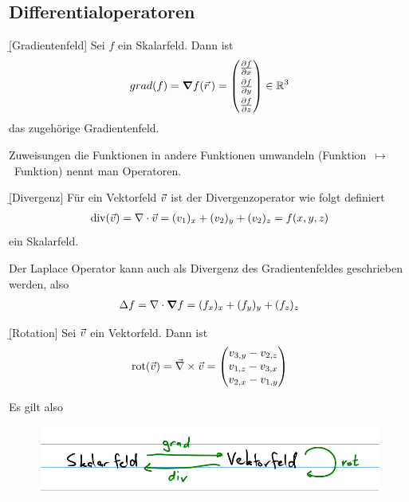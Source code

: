 \documentclass[12pt]{article}
\begin{document}
\subsection{Differentialoperatoren}

\begin{defn}{\b{[Gradientenfeld]}}
    Sei $f$ ein Skalarfeld. Dann ist
    \begin{align}
        grad(f)=\grad{f(\vr\,)}=\begin{pmatrix}
                                    \pdv{f}{x} \\[4pt]
                                    \pdv{f}{y} \\[4pt]
                                    \pdv{f}{z}
                                \end{pmatrix}\in\R^3
    \end{align} das zugehörige Gradientenfeld.
\end{defn}

\begin{rmk}{}{} Zuweisungen die Funktionen in andere Funktionen umwandeln (Funktion~$\mapsto$~Funktion) nennt man Operatoren.
\end{rmk}\vspace*{1em}

\begin{defn}{\b{[Divergenz]}} Für ein Vektorfeld $\vec{v}$ ist der Divergenzoperator wie folgt definiert
    \begin{align}
        \mathrm{div}(\vec{v})=\nabla\cdot{\vec{v}}=(v_1)_x+(v_2)_y+(v_2)_z=f(x,y,z)
    \end{align} ein Skalarfeld.
\end{defn}

\begin{rmk}{}{}
Der Laplace Operator kann auch als Divergenz des Gradientenfeldes geschrieben werden, also
\begin{align}
    \Delta{f}=\nabla\cdot\grad{f}=(f_x)_x+(f_y)_y+(f_z)_z
\end{align}
\end{rmk}

\begin{defn}{\b{[Rotation]}} Sei $\vec{v}$ ein Vektorfeld. Dann ist
    \begin{align}
        \mathrm{rot}(\vec{v})=\vec\nabla\times\vec{v}=\begin{pmatrix}
            v_{3,y}-v_{2,z}\\
            v_{1,z}-v_{3,x}\\
            v_{2,x}-v_{1,y}
        \end{pmatrix}
    \end{align}
\end{defn}

Es gilt also
\begin{figure}[htbp!]
    \centering
    \includegraphics[scale=0.6]{imgs/skalarfeld-vektorfeld-relation.png}
\end{figure}
\end{document}
